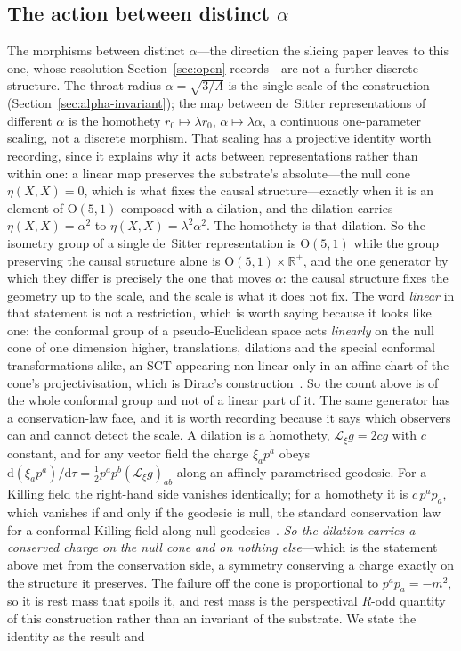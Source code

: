 \documentclass[11pt,a4paper]{article}
\theoremstyle{definition}
\begin{document}
\subsection{The action between distinct $\alpha$}\label{sec:alpha-action}

The morphisms between distinct $\alpha$---the direction the slicing paper leaves to this one, whose resolution Section~\ref{sec:open} records---are not a further discrete structure. The throat radius $\alpha=\sqrt{3/\Lambda}$ is the single scale of the construction (Section~\ref{sec:alpha-invariant}); the map between de~Sitter representations of different $\alpha$ is the homothety $r_{0}\mapsto\lambda r_{0}$, $\alpha\mapsto\lambda\alpha$, a continuous one-parameter scaling, not a discrete morphism. That scaling has a projective identity worth recording, since it explains why it acts between representations rather than within one: a linear map preserves the substrate's absolute---the null cone $\eta(X,X)=0$, which is what fixes the causal structure---exactly when it is an element of $\mathrm{O}(5,1)$ composed with a dilation, and the dilation carries $\eta(X,X)=\alpha^{2}$ to $\eta(X,X)=\lambda^{2}\alpha^{2}$. The homothety is that dilation. So the isometry group of a single de~Sitter representation is $\mathrm{O}(5,1)$ while the group preserving the causal structure alone is $\mathrm{O}(5,1)\times\mathbb{R}^{+}$, and the one generator by which they differ is precisely the one that moves $\alpha$: the causal structure fixes the geometry up to the scale, and the scale is what it does not fix. The word \emph{linear} in that statement is not a restriction, which is worth saying because it looks like one: the conformal group of a pseudo-Euclidean space acts \emph{linearly} on the null cone of one dimension higher, translations, dilations and the special conformal transformations alike, an SCT appearing non-linear only in an affine chart of the cone's projectivisation, which is Dirac's construction~\cite{Dirac1936}. So the count above is of the whole conformal group and not of a linear part of it. The same generator has a conservation-law face, and it is worth recording because it says which observers can and cannot detect the scale. A dilation is a homothety, $\mathcal{L}_{\xi}g=2cg$ with $c$ constant, and for any vector field the charge $\xi_{a}p^{a}$ obeys $\mathrm{d}(\xi_{a}p^{a})/\mathrm{d}\tau=\tfrac12 p^{a}p^{b}(\mathcal{L}_{\xi}g)_{ab}$ along an affinely parametrised geodesic. For a Killing field the right-hand side vanishes identically; for a homothety it is $c\,p^{a}p_{a}$, which vanishes if and only if the geodesic is null, the standard conservation law for a conformal Killing field along null geodesics~\cite{Wald1984}. \emph{So the dilation carries a conserved charge on the null cone and on nothing else}---which is the statement above met from the conservation side, a symmetry conserving a charge exactly on the structure it preserves. The failure off the cone is proportional to $p^{a}p_{a}=-m^{2}$, so it is rest mass that spoils it, and rest mass is the perspectival $R$-odd quantity of this construction rather than an invariant of the substrate. We state the identity as the result and 
\end{document}
